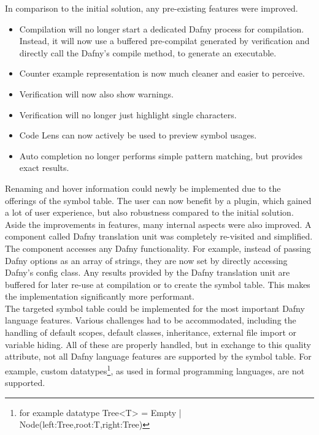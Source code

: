 In comparison to the initial solution, any pre-existing features were improved.

\begin{itemize}
 \item Compilation will no longer start a dedicated Dafny process for compilation. Instead, it will now use a buffered pre-compilat generated by verification and directly call the Dafny's compile method, to generate an executable.
 \item Counter example representation is now much cleaner and easier to perceive.
 \item Verification will now also show warnings.
 \item Verification will no longer just highlight single characters.
 \item Code Lens can now actively be used to preview symbol usages.
 \item Auto completion no longer performs simple pattern matching, but provides exact results.
\end{itemize}
Renaming and hover information could newly be implemented due to the offerings of the symbol table.
The user can now benefit by a plugin, which gained a lot of user experience, but also robustness compared to the initial solution.\\

Aside the improvements in features, many internal aspects were also improved.
A component called Dafny translation unit was completely re-visited and simplified.
The component accesses any Dafny functionality.
For example, instead of passing Dafny options as an array of strings, they are now set by
directly accessing Dafny's config class.
Any results provided by the Dafny translation unit are buffered for later re-use at compilation or to create the symbol table.
This makes the implementation significantly more performant.\\

The targeted symbol table could be implemented for the most important Dafny language features.
Various challenges had to be accommodated, including the handling of default scopes, default classes, inheritance, external file import or variable hiding.
All of these are properly handled, but in exchange to this quality attribute, not all Dafny language features are supported by the symbol table.
For example, custom datatypes\footnote{for example datatype Tree<T> = Empty | Node(left:Tree,root:T,right:Tree)}, as used in formal programming languages, are not supported.\\

